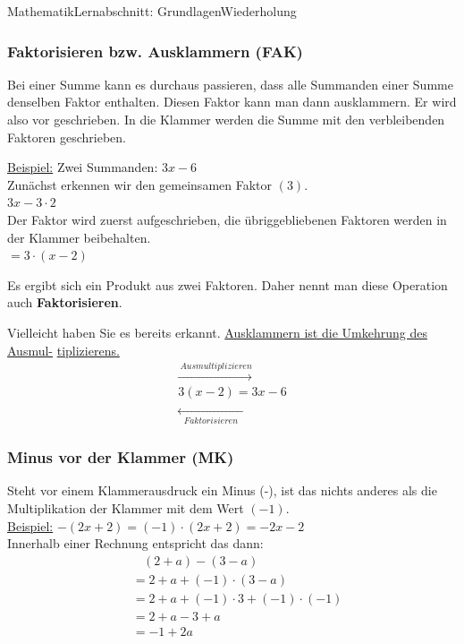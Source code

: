 \documentclass[11pt,twocolumn,oneside,openany,headings=optiontotoc,11pt,numbers=noenddot]{article}
\begin{document}
\begin{worksheet}{Mathematik}{Lernabschnitt: Grundlagen}{Wiederholung}
		\subsubsection*{Faktorisieren bzw. Ausklammern (FAK)}
		Bei einer Summe kann es durchaus passieren, dass alle Summanden einer Summe denselben Faktor enthalten. Diesen Faktor kann man dann ausklammern. Er wird also vor geschrieben. In die Klammer werden die Summe mit den verbleibenden Faktoren geschrieben.\\
		\par\noindent
		\underline{Beispiel:} Zwei Summanden: \(3x - 6\)\\
		Zunächst erkennen wir den gemeinsamen Faktor \((3)\).\\
		\(\mbox{3}x - \mbox{3}\cdot{}2\)\\
		Der Faktor wird zuerst aufgeschrieben, die übriggebliebenen Faktoren werden in der Klammer beibehalten.\\
		\(= \mbox{3}\cdot{}(x - 2)\)\\
		\par\noindent
		Es ergibt sich ein Produkt aus zwei Faktoren. Daher nennt man diese Operation auch \textbf{Faktorisieren}.\\
		\par\noindent
		Vielleicht haben Sie es bereits erkannt. \underline{Ausklammern ist die Umkehrung des Ausmul-} \underline{tiplizierens.}
		\begin{align*}
			\xrightarrow{\ Ausmultiplizieren}\\
			3(x-2) = 3x - 6\\
			\xleftarrow[\ \ \ Faktorisieren\ \ \ ]{}
		\end{align*}
		\subsubsection*{Minus vor der Klammer (MK)}
		Steht vor einem Klammerausdruck ein Minus (-), ist das nichts anderes als die Multiplikation der Klammer mit dem Wert \((-1)\).\\
		\underline{Beispiel:} \(-(2x + 2) = (-1)\cdot{}(2x+2) = -2x - 2\)\\
		Innerhalb einer Rechnung entspricht das dann:
		\begin{align*}
			& \ \ \ \ (2+a) - (3 - a)\\
			& = 2 + a + (-1)\cdot{}(3-a)\\
			& = 2 + a + (-1)\cdot{}3 + (-1)\cdot{}(-1)\\
			& = 2 + a - 3 + a\\
			& = -1 + 2a
		\end{align*}

\end{worksheet}
\end{document}
